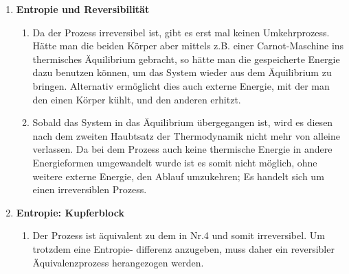 \documentclass[11pt,letterpaper]{article}
\begin{document}
\begin{enumerate}
\begin{enumerate}
        \end{enumerate}
    \newpage
    \item \textbf{Entropie und Reversibilität}
        \begin{enumerate}
            \item
            Da der Prozess irreversibel ist, gibt es erst mal keinen Umkehrprozess. 
            Hätte man die beiden Körper aber mittels
            z.B. einer Carnot-Maschine ins thermisches Äquilibrium gebracht, so hätte 
            man die gespeicherte Energie dazu benutzen
            können, um das System wieder aus dem Äquilibrium zu bringen. Alternativ
            ermöglicht dies auch externe Energie, mit der man den einen Körper kühlt, und den 
            anderen erhitzt.

            \item
            Sobald das System in das Äquilibrium übergegangen ist, wird es diesen
            nach dem zweiten Haubtsatz der Thermodynamik nicht mehr von alleine verlassen.
            Da bei dem Prozess auch keine thermische Energie in andere Energieformen umgewandelt
            wurde ist es somit nicht möglich, ohne weitere externe Energie, den Ablauf umzukehren; 
            Es handelt sich um einen irreversiblen Prozess.


        \end{enumerate}
    
    \item \textbf{Entropie: Kupferblock}
        \begin{enumerate}
            \item 
            Der Prozess ist äquivalent zu dem in Nr.4 und somit irreversibel. Um trotzdem 
            eine Entropie- differenz anzugeben, muss daher ein reversibler Äquivalenzprozess
            herangezogen werden. 


\end{enumerate}
\end{enumerate}
\end{document}
